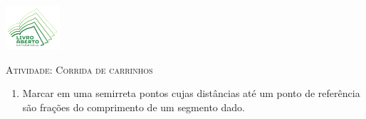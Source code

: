 \documentclass[10 pt,usenames,dvipsnames, oneside]{article}
\begin{document}
\begin{center}
  \begin{minipage}[l]{3cm}
\includegraphics[width=2cm]{logo}    
\end{minipage}\hfill
\begin{minipage}[r]{.8\textwidth}
 {\Large \scshape Atividade: Corrida de carrinhos}  
\end{minipage}
\end{center}
\vspace{.2cm}

\ifdefined\prof
\begin{goals}
\begin{enumerate}

    \item       Marcar em uma semirreta pontos cujas distâncias até um ponto de referência são frações do comprimento de um segmento dado.

\end{enumerate}
\tcblower


\end{goals}
\end{document}
